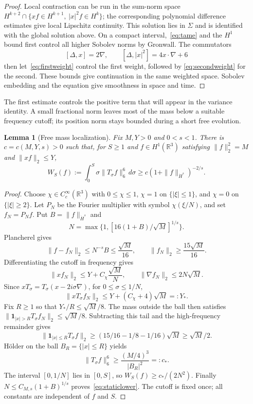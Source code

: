 \documentclass[11pt]{article}
\newcommand{\R}{\mathbb R}
\numberwithin{equation}{section}
\newtheorem{lemma}{Lemma}[section]
\begin{document}
\begin{proof}
Local contraction can be run in the sum-norm space
$H^{k+2}\cap\{xf\in H^{k+1},\ |x|^2f\in H^k\}$; the corresponding
polynomial difference estimates give local Lipschitz continuity.
This solution lies in $\Sigma$ and is identified with the global solution above.
On a compact interval,~\eqref{eq:tame} and the $H^1$ bound first control all
higher Sobolev norms by Gronwall. The commutators
\[
 [\Delta,x]=2\nabla,\qquad [\Delta,|x|^2]=4x\cdot\nabla+6
\]
then let~\eqref{eq:firstweight} control the first weight, followed by
\eqref{eq:secondweight} for the second. These bounds give continuation in the
same weighted space. Sobolev embedding and the equation give smoothness in
space and time.
\end{proof}

The first estimate controls the positive term that will appear in the variance
identity. A small fractional norm leaves most of the mass below a suitable
frequency cutoff; its position norm stays bounded during a short free evolution.

\begin{lemma}[Free mass localization]\label{lem:localization}
Fix $M,Y>0$ and $0<s<1$. There is $c=c(M,Y,s)>0$ such that, for $S\ge1$ and
$f\in H^1(\R^3)$ satisfying $\|f\|_2^2=M$ and $\|xf\|_2\le Y$,
\begin{equation}\label{eq:staticlower}
 W_S(f):=\int_0^S\sigma\|T_\sigma f\|_6^6\,d\sigma
 \ge c(1+\|f\|_{\dot H^s})^{-2/s}.
\end{equation}
\end{lemma}

\begin{proof}
Choose $\chi\in C_c^\infty(\R^3)$ with $0\le\chi\le1$, $\chi=1$ on
$\{|\xi|\le1\}$, and $\chi=0$ on $\{|\xi|\ge2\}$. Let $P_N$ be the Fourier
multiplier with symbol $\chi(\xi/N)$, and set $f_N=P_Nf$. Put
$B=\|f\|_{\dot H^s}$ and
\[
 N=\max\{1,[16(1+B)/\sqrt M]^{1/s}\}.
\]
Plancherel gives
\[
 \|f-f_N\|_2\le N^{-s}B\le\frac{\sqrt M}{16},
 \qquad \|f_N\|_2\ge\frac{15\sqrt M}{16}.
\]
Differentiating the cutoff in frequency gives
\[
 \|xf_N\|_2\le Y+C_\chi\frac{\sqrt M}{N},
 \qquad \|\nabla f_N\|_2\le2N\sqrt M.
\]
Since $xT_\sigma=T_\sigma(x-2i\sigma\nabla)$, for $0\le\sigma\le1/N$,
\[
 \|xT_\sigma f_N\|_2\le Y+(C_\chi+4)\sqrt M=:Y_*.
\]
Fix $R\ge1$ so that $Y_*/R\le\sqrt M/8$. The mass outside the ball then
satisfies $\|\mathbf1_{|x|>R}T_\sigma f_N\|_2\le\sqrt M/8$. Subtracting
this tail and the high-frequency remainder gives
\[
 \|\mathbf1_{|x|\le R}T_\sigma f\|_2
 \ge(15/16-1/8-1/16)\sqrt M\ge\sqrt M/2.
\]
H\"older on the ball $B_R=\{|x|\le R\}$ yields
\[
 \|T_\sigma f\|_6^6\ge\frac{(M/4)^3}{|B_R|^2}=:c_*.
\]
The interval $[0,1/N]$ lies in $[0,S]$, so $W_S(f)\ge c_*/(2N^2)$.
Finally $N\le C_{M,s}(1+B)^{1/s}$ proves~\eqref{eq:staticlower}.
The cutoff is fixed once; all constants are independent of $f$ and $S$.
\end{proof}
\end{document}
